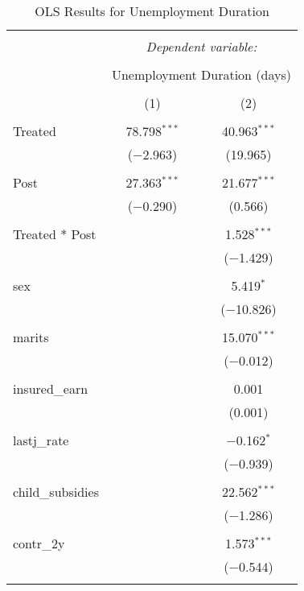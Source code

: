 
\begin{table}[!htbp] \centering 
  \caption{OLS Results for Unemployment Duration} 
  \label{} 
\begin{tabular}{@{\extracolsep{5pt}}lcc} 
\\[-1.8ex]\hline 
\hline \\[-1.8ex] 
 & \multicolumn{2}{c}{\textit{Dependent variable:}} \\ 
\cline{2-3} 
\\[-1.8ex] & \multicolumn{2}{c}{Unemployment Duration (days)} \\ 
\\[-1.8ex] & (1) & (2)\\ 
\hline \\[-1.8ex] 
 Treated & 78.798$^{***}$ & 40.963$^{***}$ \\ 
  & ($-$2.963) & (19.965) \\ 
  & & \\ 
 Post & 27.363$^{***}$ & 21.677$^{***}$ \\ 
  & ($-$0.290) & (0.566) \\ 
  & & \\ 
 Treated * Post &  & 1.528$^{***}$ \\ 
  &  & ($-$1.429) \\ 
  & & \\ 
 sex &  & 5.419$^{*}$ \\ 
  &  & ($-$10.826) \\ 
  & & \\ 
 marits &  & 15.070$^{***}$ \\ 
  &  & ($-$0.012) \\ 
  & & \\ 
 insured\_earn &  & 0.001 \\ 
  &  & (0.001) \\ 
  & & \\ 
 lastj\_rate &  & $-$0.162$^{*}$ \\ 
  &  & ($-$0.939) \\ 
  & & \\ 
 child\_subsidies &  & 22.562$^{***}$ \\ 
  &  & ($-$1.286) \\ 
  & & \\ 
 contr\_2y &  & 1.573$^{***}$ \\ 
  &  & ($-$0.544) \\ 
  & & \\ 

\end{tabular}
\end{table}
